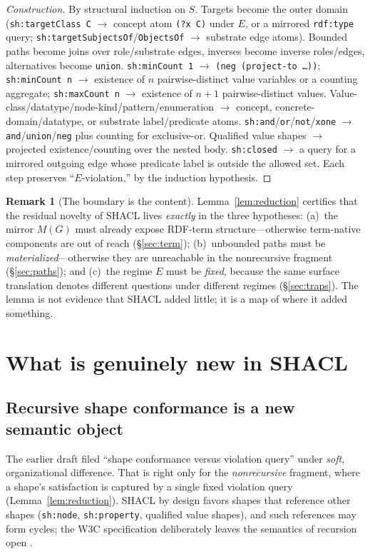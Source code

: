 \documentclass[11pt,letterpaper]{article}
\theoremstyle{definition}
\newtheorem{remark}{Remark}
\newcommand{\shacl}{SHACL}
\newcommand{\rdf}{RDF}
\begin{document}
\begin{proof}[Construction]
By structural induction on $S$. Targets become the outer domain (\texttt{sh:targetClass C} $\to$ concept atom \texttt{(?x C)} under $E$, or a mirrored \texttt{rdf:type} query; \texttt{sh:targetSubjectsOf}/\texttt{ObjectsOf} $\to$ substrate edge atoms). Bounded paths become joins over role/substrate edges, inverses become inverse roles/edges, alternatives become \texttt{union}. \texttt{sh:minCount 1} $\to$ \texttt{(neg (project-to \dots))}; \texttt{sh:minCount n} $\to$ existence of $n$ pairwise-distinct value variables or a counting aggregate; \texttt{sh:maxCount n} $\to$ existence of $n{+}1$ pairwise-distinct values. Value-class/datatype/node-kind/pattern/enumeration $\to$ concept, concrete-domain/datatype, or substrate label/predicate atoms. \texttt{sh:and}/\texttt{or}/\texttt{not}/\texttt{xone} $\to$ \texttt{and}/\texttt{union}/\texttt{neg} plus counting for exclusive-or. Qualified value shapes $\to$ projected existence/counting over the nested body. \texttt{sh:closed} $\to$ a query for a mirrored outgoing edge whose predicate label is outside the allowed set. Each step preserves ``$E$-violation,'' by the induction hypothesis. \end{proof}

\begin{remark}[The boundary is the content]\label{rem:boundary}
Lemma~\ref{lem:reduction} certifies that the residual novelty of \shacl{} lives \emph{exactly} in the three hypotheses: (a)~the mirror $M(G)$ must already expose \rdf{}-term structure---otherwise term-native components are out of reach (\S\ref{sec:term}); (b)~unbounded paths must be \emph{materialized}---otherwise they are unreachable in the nonrecursive fragment (\S\ref{sec:paths}); and (c)~the regime $E$ must be \emph{fixed}, because the same surface translation denotes different questions under different regimes (\S\ref{sec:traps}). The lemma is not evidence that \shacl{} added little; it is a map of where it added something.
\end{remark}

\section{What is genuinely new in SHACL}\label{sec:new}

\subsection{Recursive shape conformance is a new semantic object}\label{sec:recursion}
The earlier draft filed ``shape conformance versus violation query'' under \emph{soft}, organizational difference. That is right only for the \emph{nonrecursive} fragment, where a shape's satisfaction is captured by a single fixed violation query (Lemma~\ref{lem:reduction}). \shacl{} by design favors shapes that reference other shapes (\texttt{sh:node}, \texttt{sh:property}, qualified value shapes), and such references may form cycles; the W3C specification deliberately leaves the semantics of recursion open \cite{shacl}.
\end{document}
